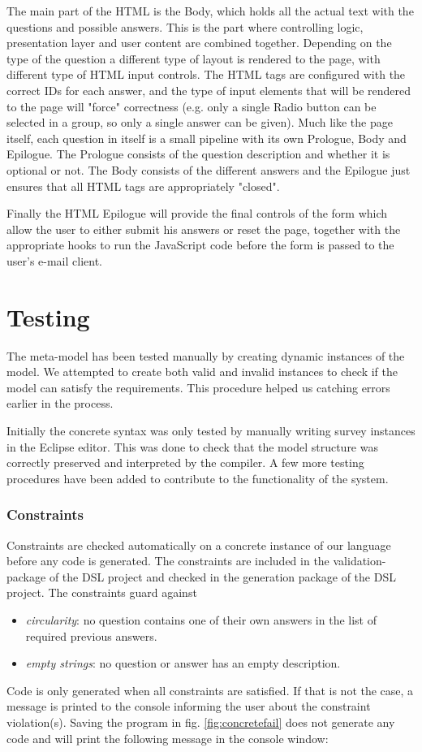 \documentclass[runningheads]{llncs}
\begin{document}
The main part of the HTML is the Body, which holds all the actual text with the questions and possible answers. This is the part where controlling logic, presentation layer and user content are combined together. Depending on the type of the question a different type of layout is rendered to the page, with different type of HTML input controls. The HTML tags are configured with the correct IDs for each answer, and the type of input elements that will be rendered to the page will "force" correctness (e.g. only a single Radio button can be selected in a group, so only a single answer can be given). Much like the page itself, each question in itself is a small pipeline with its own Prologue, Body and Epilogue. The Prologue consists of the question description and whether it is optional or not. The Body consists of the different answers and the Epilogue just ensures that all HTML tags are appropriately "closed".  

Finally the HTML  Epilogue will provide the final controls of the form which allow the user to either submit his answers or reset the page, together with the appropriate hooks to run the JavaScript code before the form is passed to the user's e-mail client.

\section{Testing}
The meta-model has been tested manually by creating dynamic instances of the model. We attempted to create both valid and invalid instances to check if the model can satisfy the requirements. This procedure helped us catching errors earlier in the process.

Initially the concrete syntax was only tested by manually writing survey instances in the Eclipse editor. This was done to check that the model structure was correctly preserved and interpreted by the compiler. A few more testing procedures have been added to contribute to the functionality of the system.
\subsubsection{Constraints}
Constraints are checked automatically on a concrete instance of our language before any code is generated. The constraints are included in the validation-package of the DSL project and checked in the generation package of the DSL project. The constraints guard against
\begin{itemize}
\item \emph{circularity}: no question contains one of their own answers in the list of required previous answers.
\item \emph{empty strings}: no question or answer has an empty description.
\end{itemize}
Code is only generated when all constraints are satisfied. If that is not the case, a message is printed to the console informing the user about the constraint violation(s). Saving the program in fig. \ref{fig:concretefail} does not generate any code and will print the following message in the console window:
\end{document}
